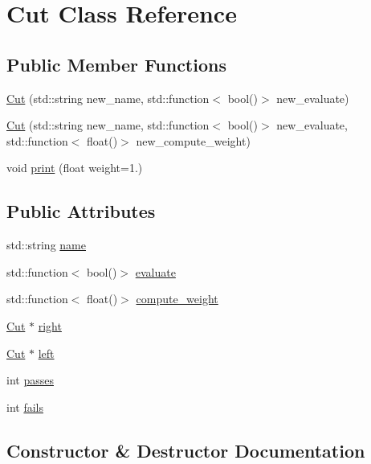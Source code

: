 \hypertarget{classCut}{}\section{Cut Class Reference}
\label{classCut}
\subsection*{Public Member Functions}
\begin{DoxyCompactItemize}
\item 
\hyperlink{classCut_aaa89435c5326080296041bc38937ab2d}{Cut} (std\+::string new\+\_\+name, std\+::function$<$ bool()$>$ new\+\_\+evaluate)
\item 
\hyperlink{classCut_adcfec6d2df97f8e84058078f2f736b03}{Cut} (std\+::string new\+\_\+name, std\+::function$<$ bool()$>$ new\+\_\+evaluate, std\+::function$<$ float()$>$ new\+\_\+compute\+\_\+weight)
\item 
void \hyperlink{classCut_af05a93abb03377951fb2e7da79a7e5df}{print} (float weight=1.)
\end{DoxyCompactItemize}
\subsection*{Public Attributes}
\begin{DoxyCompactItemize}
\item 
std\+::string \hyperlink{classCut_accf700d2d00746b97a265d4aea3f55c2}{name}
\item 
std\+::function$<$ bool()$>$ \hyperlink{classCut_a4205ad5e62b859536797141f3ace2253}{evaluate}
\item 
std\+::function$<$ float()$>$ \hyperlink{classCut_a908dfdeed9d882ca026427c0942fb999}{compute\+\_\+weight}
\item 
\hyperlink{classCut}{Cut} $\ast$ \hyperlink{classCut_a2142ffe68028bb0c211408c0f5bb8bfb}{right}
\item 
\hyperlink{classCut}{Cut} $\ast$ \hyperlink{classCut_a2c65e372172dfa0f705d117d3ad0f668}{left}
\item 
int \hyperlink{classCut_a9ec802667c770787a473c622208ef35c}{passes}
\item 
int \hyperlink{classCut_a7bfcec46b8c2879a9660ac7656ed7b83}{fails}
\end{DoxyCompactItemize}


\subsection{Constructor \& Destructor Documentation}
